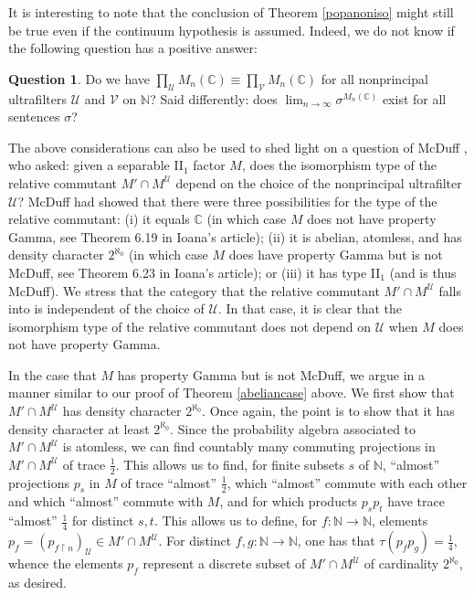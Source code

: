 \documentclass[12pt]{amsart}
\theoremstyle{definition}
\newtheorem{question}[thm]{Question}
\def\bb{\mathbb}
\def\bb{\mathbb}
\def\cal{\mathcal}
\def\u{\mathsf 1}
\def \u{\mathcal U}
\begin{document}
It is interesting to note that the conclusion of Theorem \ref{popanoniso} might still be true even if the continuum hypothesis is assumed.  Indeed, we do not know if the following question has a positive answer:

\begin{question}
Do we have $\prod_\u M_n(\bb C)\equiv \prod_{\cal V}M_n(\bb C)$ for all nonprincipal ultrafilters $\u$ and $\cal V$ on $\bb N$?  Said differently:  does $\lim_{n\to \infty}\sigma^{M_n(\bb C)}$ exist for all sentences $\sigma$?
\end{question}

The above considerations can also be used to shed light on a question of McDuff \cite{mcduff}, who asked:  given a separable II$_1$ factor $M$, does the isomorphism type of the relative commutant $M'\cap M^\u$ depend on the choice of the nonprincipal ultrafilter $\u$?  McDuff had showed that there were three possibilities for the type of the relative commutant:  (i)  it equals $\bb C$ (in which case $M$ does not have property Gamma, see Theorem 6.19 in Ioana's article);  (ii) it is abelian, atomless, and has density character $2^{\aleph_0}$ (in which case $M$ does have property Gamma but is not McDuff, see Theorem 6.23 in Ioana's article); or (iii) it has type II$_1$ (and is thus McDuff).  We stress that the category that the relative commutant $M'\cap M^\u$ falls into is independent of the choice of $\u$.  In that case, it is clear that the isomorphism type of the relative commutant does not depend on $\u$ when $M$ does not have property Gamma.

In the case that $M$ has property Gamma but is not McDuff, we argue in a manner similar to our proof of Theorem \ref{abeliancase} above.  We first show that $M'\cap M^\u$ has density character $2^{\aleph_0}$.  Once again, the point is to show that it has density character at least $2^{\aleph_0}$.  Since the probability algebra associated to $M'\cap M^\u$ is atomless, we can find countably many commuting projections in $M'\cap M^\u$ of trace $\frac{1}{2}$.  This allows us to find, for finite subsets $s$ of $\bb N$, ``almost'' projections $p_s$ in $M$ of trace ``almost'' $\frac{1}{2}$, which ``almost'' commute with each other and which ``almost'' commute with $M$, and for which products $p_sp_t$ have trace ``almost'' $\frac{1}{4}$ for distinct $s,t$.  This allows us to define, for $f:\bb N\to \bb N$, elements $p_f=(p_{f\upharpoonright n})_\u\in M'\cap M^\u$.  For distinct $f,g:\bb N\to \bb N$, one has that $\tau(p_fp_g)=\frac{1}{4}$, whence the elements $p_f$ represent a discrete subset of $M'\cap M^\u$ of cardinality $2^{\aleph_0}$, as desired.
\end{document}
